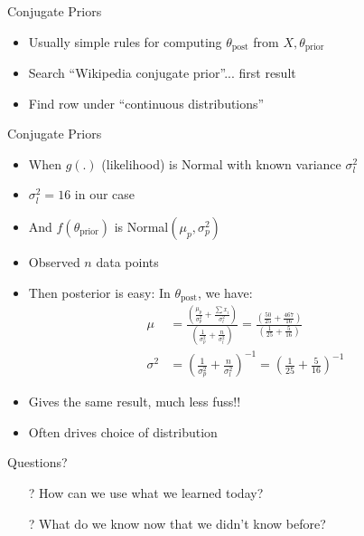 \documentclass[aspectratio=169]{beamer}
\begin{document}
\begin{frame}{Conjugate Priors}

\begin{itemize} 
	\item Usually simple rules for computing $\theta_{\textrm{post}}$ 
		from $X, \theta_{\textrm{prior}}$
	\item Search ``Wikipedia conjugate prior''... first result
	\item Find row under ``continuous distributions''
\end{itemize}
				
\end{frame}

\begin{frame}{Conjugate Priors}

\begin{itemize} 
		\item When $g(.)$ (likelihood) is Normal with known variance $\sigma_l^2$
		\item $\sigma_l^2 = 16$ in our case
		\item And $f(\theta_{\textrm{prior}})$ is Normal$(\mu_p, \sigma_p^2)$
		\item Observed $n$ data points
		\item Then posterior is easy: In $\theta_{\textrm{post}}$, we have:
		\begin{align}
			\mu &= \frac{\left(\frac{\mu_p}{\sigma^2_p} + \frac{\sum x_i}{\sigma_l^2} \right)}
				{\left(\frac{1}{\sigma^2_p} + \frac{n}{\sigma_l^2} \right) }= 
				\frac{\left( \frac{50}{25} + \frac{467}{16} \right) }{ \left(\frac{1}{25} 
					+ \frac{5}{16}\right)} \nonumber \\
			\sigma^2 &= \left(\frac{1}{\sigma^2_p} + \frac{n}{\sigma_l^2} \right)^{-1} =
				\left(\frac{1}{25} + \frac{5}{16}\right)^{-1} \nonumber
		\end{align}
		\item Gives the same result, much less fuss!!
		\item Often drives choice of distribution
\end{itemize}
				
\end{frame}
\begin{frame}{Questions?}
\begin{itemize}
	\item[?] How can we use what we learned today?
	\vspace{2em}
	\item[?] What do we know now that we didn't know before?
\end{itemize}
\end{frame}
\end{document}
